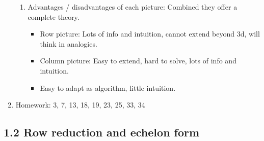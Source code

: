 \documentclass{article}
\begin{document}
\begin{enumerate}
\begin{enumerate}
\item Advantages / disadvantages of each picture: Combined they offer a complete theory.
\begin{itemize}
\item Row picture: Lots of info and intuition, cannot extend beyond 3d, will think in analogies.
\item Column picture: Easy to extend, hard to solve, lots of info and intuition.
\item Easy to adapt as algorithm, little intuition.
\end{itemize}

\end{enumerate}

\item Homework: 3, 7, 13, 18, 19, 23, 25, 33, 34

\end{enumerate}

\subsection{1.2 Row reduction and echelon form}
\end{document}
